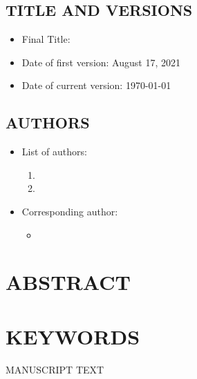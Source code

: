 \documentclass[12pt,english]{article}
\begin{document}
\subsection*{TITLE AND VERSIONS}
\begin{itemize}[label={}, leftmargin=*]
    \item Final Title: \textbf{\PAPERTITLE}
    \item Date of first version: August 17, 2021
    \item Date of current version: \today
\end{itemize}
\subsection*{AUTHORS}
\begin{itemize}[label={}, leftmargin=*]
    \item List of authors:
    \begin{enumerate}
        \item \AUTHORHADAHINFO
        \item \AUTHORCOMPINFO
    \end{enumerate}
    \item Corresponding author:
    \begin{itemize}
        \item \textbf{\AUTHORHADAHINFO}
    \end{itemize}
\end{itemize}
\clearpage 

\doublespacing
\section*{ABSTRACT}
\PAPERABSTRACT
\clearpage 

\doublespacing
\section*{KEYWORDS}
\PAPERKEYWORDS
\clearpage 


\setcounter{page}{1}
\renewcommand*{\thefootnote}{\arabic{footnote}}
\begingroup
  \centering
  \Large MANUSCRIPT TEXT\\[1em]
\endgroup

\end{document}
